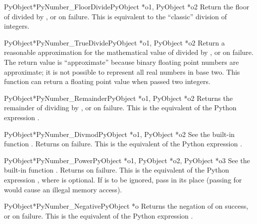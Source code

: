\begin{cfuncdesc}{PyObject*}{PyNumber_FloorDivide}{PyObject *o1, PyObject *o2}
  Return the floor of  divided by , or \NULL{} on
  failure.  This is equivalent to the ``classic'' division of
  integers.
\end{cfuncdesc}


\begin{cfuncdesc}{PyObject*}{PyNumber_TrueDivide}{PyObject *o1, PyObject *o2}
  Return a reasonable approximation for the mathematical value of
   divided by , or \NULL{} on failure.  The return
  value is ``approximate'' because binary floating point numbers are
  approximate; it is not possible to represent all real numbers in
  base two.  This function can return a floating point value when
  passed two integers.
\end{cfuncdesc}


\begin{cfuncdesc}{PyObject*}{PyNumber_Remainder}{PyObject *o1, PyObject *o2}
  Returns the remainder of dividing  by , or \NULL{}
  on failure.  This is the equivalent of the Python expression
  .
\end{cfuncdesc}


\begin{cfuncdesc}{PyObject*}{PyNumber_Divmod}{PyObject *o1, PyObject *o2}
  See the built-in function .
  Returns \NULL{} on failure.  This is the equivalent of the Python
  expression .
\end{cfuncdesc}


\begin{cfuncdesc}{PyObject*}{PyNumber_Power}{PyObject *o1,
                                             PyObject *o2, PyObject *o3}
  See the built-in function .
  Returns \NULL{} on failure.  This is the equivalent of the Python
  expression , where 
  is optional.  If  is to be ignored, pass  in
  its place (passing \NULL{} for  would cause an illegal
  memory access).
\end{cfuncdesc}


\begin{cfuncdesc}{PyObject*}{PyNumber_Negative}{PyObject *o}
  Returns the negation of  on success, or \NULL{} on failure.
  This is the equivalent of the Python expression .
\end{cfuncdesc}


